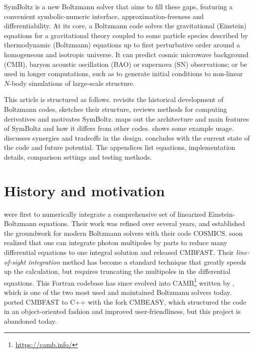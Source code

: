 \documentclass{aa}
\begin{document}
SymBoltz is a new Boltzmann solver that aims to fill these gaps, featuring a convenient symbolic-numeric interface, approximation-freeness and differentiability.
At its core, a Boltzmann code solves the gravitational (Einstein) equations for a gravitational theory coupled to some particle species described by thermodynamic (Boltzmann) equations up to first perturbative order around a homogeneous and isotropic universe.
It can predict cosmic microwave background (CMB), baryon acoustic oscillation (BAO) or supernova (SN) observations; or be used in longer computations, such as to generate initial conditions to non-linear $N$-body simulations of large-scale structure.

This article is structured as follows.
 revisits the historical development of Boltzmann codes, sketches their structure, reviews methods for computing derivatives and motivates SymBoltz.
 maps out the architecture and main features of SymBoltz and how it differs from other codes.
 shows some example usage.
 discusses synergies and tradeoffs in the design.
 concludes with the current state of the code and future potential.
The appendices list equations, implementation details, comparison settings and testing methods.

\section{History and motivation}
\label{sec:intro}

\cite{peeblesPrimevalAdiabaticPerturbation1970} were first to numerically integrate a comprehensive set of linearized Einstein-Boltzmann equations.
Their work was refined over several years, and \cite{maCosmologicalPerturbationTheory1995} established the groundwork for modern Boltzmann solvers with their code COSMICS.
\cite{seljakLineSightApproach1996} soon realized that one can integrate photon multipoles by parts to reduce many differential equations to one integral solution and released CMBFAST.
Their \textit{line-of-sight integration} method has become a standard technique that greatly speeds up the calculation, but requires truncating the multipoles in the differential equations.
This Fortran codebase has since evolved into CAMB\footnote{\url{https://camb.info/}} written by \cite{lewisEfficientComputationCMB2000a}, which is one of the two most used and maintained Boltzmann solvers today.
\cite{doranCMBEASYObjectOriented2005} ported CMBFAST to C++ with the fork CMBEASY, which structured the code in an object-oriented fashion and improved user-friendliness, but this project is abandoned today.
\end{document}
